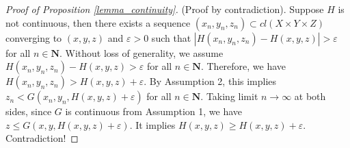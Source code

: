 \documentclass[a4paper, 11pt]{amsart}
\numberwithin{equation}{section}
\theoremstyle{plain}
\theoremstyle{definition}
\theoremstyle{remark}
\newcommand{\N}{\mathbf{N}}
\begin{document}
\vspace{0.3cm}
\begin{proof}[Proof of Proposition \ref{lemma_continuity}]
	(Proof by contradiction). Suppose $H$ is not continuous, then there exists a sequence ${(x_n, y_n, z_n)} \subset cl(X\times Y \times Z)$ converging to $(x, y, z)$ and $\varepsilon >0$ such that $|H(x_n, y_n, z_n) - H(x,y,z)|>\varepsilon$ for all $n\in \N$. Without loss of generality, we assume $H(x_n, y_n, z_n) - H(x,y,z)>\varepsilon$ for all $n\in \N$. Therefore, we have $H(x_n, y_n, z_n) > H(x,y,z)+\varepsilon$. By Assumption 2, this implies $z_n < G(x_n, y_n, H(x,y,z)+\varepsilon)$ for all $n\in \N$. Taking limit $n\rightarrow \infty$ at both sides, since $G$ is continuous from Assumption 1, we have $z \le G(x, y, H(x,y,z)+\varepsilon)$. It implies $H(x,y,z) \ge H(x,y,z)+\varepsilon$. Contradiction!
\end{proof}
\end{document}

